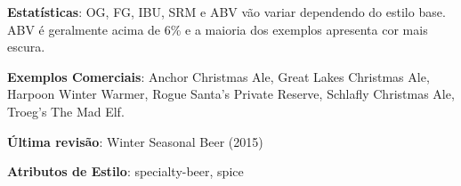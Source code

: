 \textbf{Estatísticas}: OG, FG, IBU, SRM e ABV vão variar dependendo do estilo base. ABV é geralmente acima de 6\% e a maioria dos exemplos apresenta cor mais escura.

\textbf{Exemplos Comerciais}: Anchor Christmas Ale, Great Lakes Christmas Ale, Harpoon Winter Warmer, Rogue Santa's Private Reserve, Schlafly Christmas Ale, Troeg's The Mad Elf.

\textbf{Última revisão}: Winter Seasonal Beer (2015)

\textbf{Atributos de Estilo}: specialty-beer, spice
